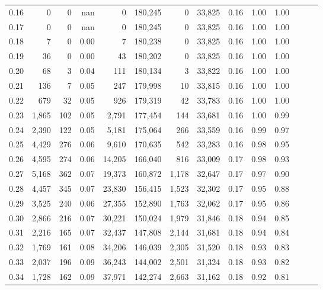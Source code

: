 \begin{tabular}{rrrrrrrrrrrrrr}
0.16 &      0 &      0 &   nan &        0 &  180,245 &       0 &  33,825 &  0.16 &  1.00 &      1.00 \\
0.17 &      0 &      0 &   nan &        0 &  180,245 &       0 &  33,825 &  0.16 &  1.00 &      1.00 \\
0.18 &      7 &      0 &  0.00 &        7 &  180,238 &       0 &  33,825 &  0.16 &  1.00 &      1.00 \\
0.19 &     36 &      0 &  0.00 &       43 &  180,202 &       0 &  33,825 &  0.16 &  1.00 &      1.00 \\
0.20 &     68 &      3 &  0.04 &      111 &  180,134 &       3 &  33,822 &  0.16 &  1.00 &      1.00 \\
0.21 &    136 &      7 &  0.05 &      247 &  179,998 &      10 &  33,815 &  0.16 &  1.00 &      1.00 \\
0.22 &    679 &     32 &  0.05 &      926 &  179,319 &      42 &  33,783 &  0.16 &  1.00 &      1.00 \\
0.23 &  1,865 &    102 &  0.05 &    2,791 &  177,454 &     144 &  33,681 &  0.16 &  1.00 &      0.99 \\
0.24 &  2,390 &    122 &  0.05 &    5,181 &  175,064 &     266 &  33,559 &  0.16 &  0.99 &      0.97 \\
0.25 &  4,429 &    276 &  0.06 &    9,610 &  170,635 &     542 &  33,283 &  0.16 &  0.98 &      0.95 \\
0.26 &  4,595 &    274 &  0.06 &   14,205 &  166,040 &     816 &  33,009 &  0.17 &  0.98 &      0.93 \\
0.27 &  5,168 &    362 &  0.07 &   19,373 &  160,872 &   1,178 &  32,647 &  0.17 &  0.97 &      0.90 \\
0.28 &  4,457 &    345 &  0.07 &   23,830 &  156,415 &   1,523 &  32,302 &  0.17 &  0.95 &      0.88 \\
0.29 &  3,525 &    240 &  0.06 &   27,355 &  152,890 &   1,763 &  32,062 &  0.17 &  0.95 &      0.86 \\
0.30 &  2,866 &    216 &  0.07 &   30,221 &  150,024 &   1,979 &  31,846 &  0.18 &  0.94 &      0.85 \\
0.31 &  2,216 &    165 &  0.07 &   32,437 &  147,808 &   2,144 &  31,681 &  0.18 &  0.94 &      0.84 \\
0.32 &  1,769 &    161 &  0.08 &   34,206 &  146,039 &   2,305 &  31,520 &  0.18 &  0.93 &      0.83 \\
0.33 &  2,037 &    196 &  0.09 &   36,243 &  144,002 &   2,501 &  31,324 &  0.18 &  0.93 &      0.82 \\
0.34 &  1,728 &    162 &  0.09 &   37,971 &  142,274 &   2,663 &  31,162 &  0.18 &  0.92 &      0.81 \\

\end{tabular}
